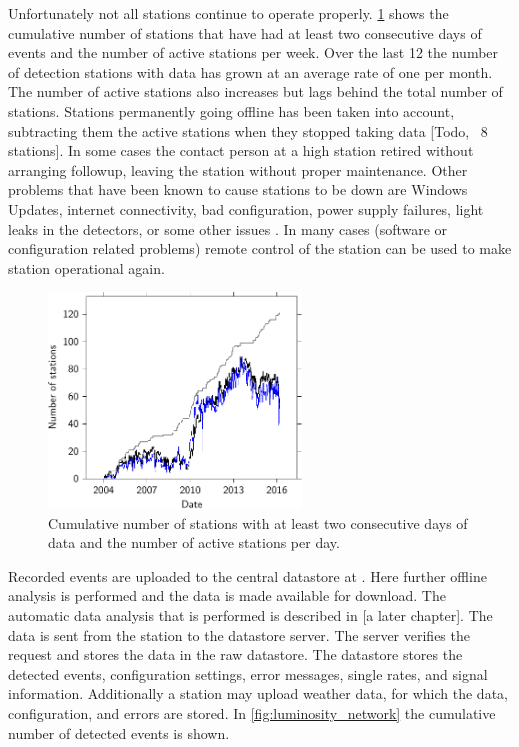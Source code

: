 Unfortunately not all stations continue to operate properly. \cref{fig:active_stations} shows the cumulative number of stations that have had at least two consecutive days of events and the number of active stations per week. Over the last \SI{12}{\year} the number of detection stations with data has grown at an average rate of one per month. The number of active stations also increases but lags behind the total number of stations. Stations permanently going offline has been taken into account, subtracting them the active stations when they stopped taking data [Todo, ~8 stations]. In some cases the contact person at a high station retired without arranging followup, leaving the station without proper maintenance. Other problems that have been known to cause stations to be down are Windows Updates, internet connectivity, bad configuration, power supply failures, light leaks in the detectors, or some other issues \cite{delaat2013maintenance}. In many cases (software or configuration related problems) remote control of the station can be used to make station operational again.

\begin{figure}
    \centering
    \includegraphics[width=0.6\textwidth]
                    {plots/cluster/active_stations}
    \caption{Cumulative number of stations with at least two consecutive days of data and the number of active stations per day.}
    \label{fig:active_stations}
\end{figure}

Recorded events are uploaded to the central datastore at \nikhef. Here further offline analysis is performed and the data is made available for download. The automatic data analysis that is performed is described in [a later chapter]. The data is sent from the station to the datastore server. The server verifies the request and stores the data in the raw datastore. The datastore stores the detected events, configuration settings, error messages, single rates, and \gps signal information. Additionally a station may upload weather data, for which the data, configuration, and errors are stored. In \cref{fig:luminosity_network} the cumulative number of detected events is shown.

